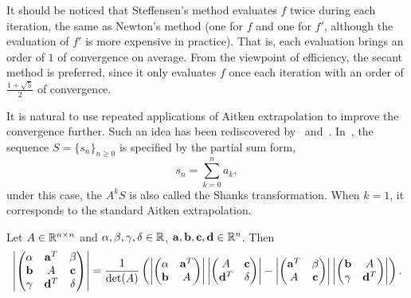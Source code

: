 \begin{remark}
    It should be noticed that Steffensen's method evaluates $f$ twice during each iteration, the same as Newton's method (one for $f$ and one for $f'$, although the evaluation of $f'$ is more expensive in practice). That is, each evaluation brings an order of $1$ of convergence on average. From the viewpoint of efficiency, the secant method is preferred, since it only evaluates $f$ once each iteration with an order of $\frac{1+\sqrt{5}}{2}$ of convergence. 
\end{remark}
It is natural to use repeated applications of Aitken extrapolation to improve the convergence further. Such an idea has been rediscovered by~\cite{schmidt1941xxxii} and~\cite{shanks1955non}. In~\cite{shanks1955non}, the sequence $S = \{s_n\}_{n\ge 0}$ is specified by the partial sum form,
\begin{equation}
    s_n = \sum_{k=0}^n a_k, 
\end{equation}
under this case, the $A^k S$ is also called the Shanks transformation. When $k=1$, it corresponds to the standard Aitken extrapolation.
\begin{lemma}
\label{Lem: 4-SYL-DET-ID}
Let $A\in \mathbb R^{n\times n}$ and $\alpha, \beta,\gamma, \delta\in\mathbb R$, $\mathbf a, \mathbf b,\mathbf c,\mathbf d\in\mathbb R^{n}$. Then
\begin{equation}
     \left| \begin{pmatrix}
      \alpha & \mathbf a^{T} & \beta  \\
        \mathbf b & A & \mathbf c \\
        \gamma & \mathbf d^T & \delta 
    \end{pmatrix}\right| = \frac{1}{\det(A)} \left(  \left| \begin{pmatrix}
      \alpha & \mathbf a^{T}   \\
        \mathbf b & A  
    \end{pmatrix}\right|     \left| \begin{pmatrix}
     A & \mathbf c \\
       \mathbf d^T & \delta 
    \end{pmatrix}\right|  -     \left| \begin{pmatrix}
      \mathbf a^{T} & \beta  \\
         A & \mathbf c \\ 
    \end{pmatrix}\right|     \left| \begin{pmatrix}
        \mathbf b & A  \\
        \gamma & \mathbf d^T  
    \end{pmatrix}\right| \right).
\end{equation}
\end{lemma}
